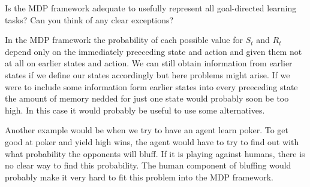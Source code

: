 \begin{exercise}
Is the MDP framework adequate to usefully represent all goal-directed learning tasks?
Can you think of any clear exceptions?
\end{exercise}

\begin{solution}
In the MDP framework the probability of each possible value for $S_t$ and $R_t$ depend only on the immediately preeceding state and action and given them not at all on earlier states and action. We can still obtain information from earlier states if we define our states accordingly but here problems might arise. If we were to include some information form earlier states into every preeceding state the amount of memory nedded for just one state would probably soon be too high. In this case it would probably be useful to use some alternatives.

Another example would be when we try to have an agent learn poker. To get good at poker and yield high wins, the agent would have to try to find out with what probability the opponents will bluff. If it is playing against humans, there is no clear way to find this probability. The human component of bluffing would probably make it very hard to fit this problem into the MDP framework.
\end{solution}

